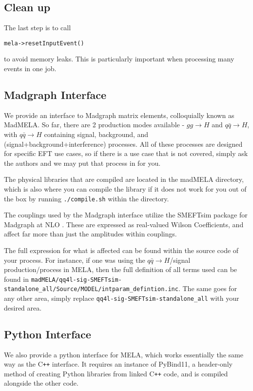 \documentclass[aps,superscriptaddress,nofootinbib]{revtex4}
\begin{document}
\subsection{Clean up}
The last step is to call
\begin{verbatim}
mela->resetInputEvent()
\end{verbatim}
to avoid memory leaks.  This is particularly important when processing many events in one job.

\subsection{Madgraph Interface}
We provide an interface to Madgraph matrix elements, colloquially known as MadMELA. So far, there are 2 production modes available - $gg\rightarrow H$ and $q\bar{q}\rightarrow H$, with $q\bar{q}\rightarrow H$ containing signal, background, and (signal+background+interference) processes. All of these processes are designed for specific EFT use cases, so if there is a use case that is not covered, simply ask the authors and we may put that process in for you.

The physical libraries that are compiled are located in the madMELA directory, which is also where you can compile the library if it does not work for you out of the box by running \verb|./compile.sh| within the directory.

The couplings used by the Madgraph interface utilize the SMEFTsim package for Madgraph at NLO  \cite{SMEFTsim2}. These are expressed as real-valued Wilson Coefficients, and affect far more than just the amplitudes within couplings.

The full expression for what is affected can be found within the source code of your process. For instance, if one was using the $q\bar{q}\rightarrow H$/signal production/process in MELA, then the full definition of all terms used can be found in \verb|madMELA/qq4l-sig-SMEFTsim-standalone_all/Source/MODEL/intparam_defintion.inc|. The same goes for any other area, simply replace \verb|qq4l-sig-SMEFTsim-standalone_all| with your desired area.

\subsection{Python Interface}
We also provide a python interface for MELA, which works essentially the same way as the C\texttt{++} interface. It requires an instance of PyBind11, a header-only method of creating Python libraries from linked C\texttt{++} code, and is compiled alongside the other code.
\end{document}
